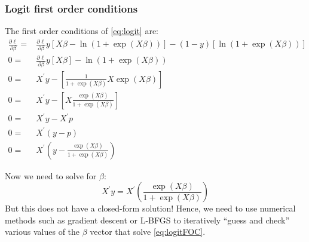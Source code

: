 \documentclass[12pt,english]{article}
\begin{document}
\subsubsection{Logit first order conditions}
The first order conditions of \eqref{eq:logit} are:
\begin{align}
    \label{eq:logitFOC}
    \frac{\partial\ell}{\partial\beta} =& \frac{\partial\ell}{\partial\beta}y\left[X\beta - \ln\left(1+\exp\left(X\beta\right)\right)\right] - \left(1-y\right)\left[\ln\left(1+\exp\left(X\beta\right)\right)\right] \nonumber \\
0 =& \frac{\partial\ell}{\partial\beta}y\left[X\beta\right] - \ln\left(1+\exp\left(X\beta\right)\right) \nonumber \\
    0 =& X^{\prime}y-\left[\frac{1}{1+\exp\left(X\beta\right)}X\exp\left(X\beta\right)\right] \nonumber \\
    0 =& X^{\prime}y-\left[X\frac{\exp\left(X\beta\right)}{1+\exp\left(X\beta\right)}\right] \nonumber \\
    0 =& X^{\prime}y-X^{\prime}p \nonumber \\
    0 =& X^{\prime}\left(y-p\right) \nonumber \\
    0 =& X^{\prime}\left(y-\frac{\exp\left(X\beta\right)}{1+\exp\left(X\beta\right)}\right) 
\end{align}

Now we need to solve for $\beta$:
\[
    X^{\prime}y=X^{\prime}\left(\frac{\exp\left(X\beta\right)}{1+\exp\left(X\beta\right)}\right)
\]
But this does not have a closed-form solution! Hence, we need to use numerical methods such as gradient descent or L-BFGS to iteratively ``guess and check'' various values of the $\beta$ vector that solve \eqref{eq:logitFOC}.
\end{document}
